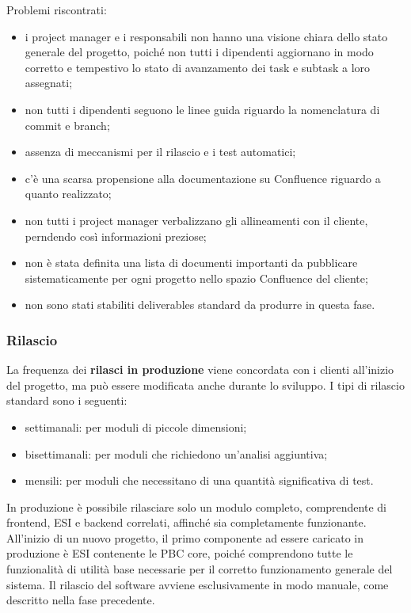         Problemi riscontrati:
        \begin{itemize}
            \item i project manager e i responsabili non hanno una visione chiara dello stato generale del progetto, poiché non tutti i dipendenti aggiornano in modo corretto e tempestivo
            lo stato di avanzamento dei task e subtask a loro assegnati;
            \item non tutti i dipendenti seguono le linee guida riguardo la nomenclatura di commit e branch;
            \item assenza di meccanismi per il rilascio e i test automatici;
            \item c'è una scarsa propensione alla documentazione su Confluence riguardo a quanto realizzato;            
            \item non tutti i project manager verbalizzano gli allineamenti con il cliente, perndendo così informazioni preziose;
            \item non è stata definita una lista di documenti importanti da pubblicare sistematicamente per ogni progetto nello spazio Confluence del cliente;
            \item non sono stati stabiliti deliverables standard da produrre in questa fase.
        \end{itemize}

        \subsubsection{Rilascio}
        La frequenza dei \textbf{rilasci in produzione} viene concordata con i clienti all'inizio del progetto, ma può essere modificata anche durante lo sviluppo.
        I tipi di rilascio standard sono i seguenti:
        \begin{itemize}
            \item settimanali: per moduli di piccole dimensioni;
            \item bisettimanali: per moduli che richiedono un'analisi aggiuntiva;
            \item mensili: per moduli che necessitano di una quantità significativa di test.
        \end{itemize}
        
        In produzione è possibile rilasciare solo un modulo completo, comprendente di frontend, \ac{ESI} e backend correlati, affinché sia completamente funzionante.
        All'inizio di un nuovo progetto, il primo componente ad essere caricato in produzione è \ac{ESI} contenente le \ac{PBC} core, poiché comprendono
        tutte le funzionalità di utilità base necessarie per il corretto funzionamento generale del sistema.
        Il rilascio del software avviene esclusivamente in modo manuale, come descritto nella fase precedente.
        
